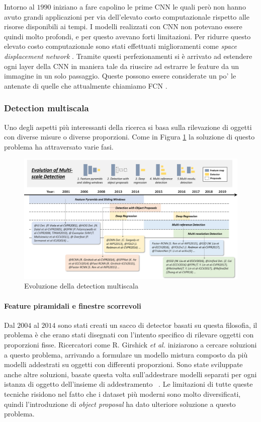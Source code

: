 Intorno al $1990$ iniziano a fare capolino le prime \ac{CNN} \cite{vaillant1994original} le quali però non hanno avuto grandi applicazioni per via dell'elevato costo computazionale rispetto alle risorse disponibili ai tempi. I modelli realizzati con \ac{CNN} non potevano essere quindi molto profondi, e per questo avevano forti limitazioni. Per ridurre questo elevato costo computazionale sono stati effettuati miglioramenti come \textit{space displacement network} \cite{lecun1998gradient}. Tramite questi perfezionamenti si è arrivato ad estendere ogni layer della \ac{CNN} in maniera tale da riuscire ad estrarre le feature da un immagine in un solo passaggio. Queste possono essere considerate un po' le antenate di quelle che attualmente chiamiamo \ac{FCN} \cite{long2015fully} \cite{chen2014semantic}. 
\subsubsection{Detection multiscala}
Uno degli aspetti più interessanti della ricerca si basa sulla rilevazione di oggetti con diverse misure o diverse proporzioni. Come in Figura \ref{fig:multi_scale_history} la soluzione di questo problema ha attraversato varie fasi.
\begin{figure}
    \centering
    \includegraphics[width=\textwidth]{images/evol-multiscale.png}
    \caption{Evoluzione della detection multiscala \cite{DBLP:journals/corr/abs-1905-05055}}
    \label{fig:multi_scale_history}
\end{figure}
\paragraph{Feature piramidali e finestre scorrevoli}
Dal $2004$ al $2014$ sono stati creati un sacco di detector basati su questa filosofia, il problema è che erano stati disegnati con l'intento specifico di rilevare oggetti con proporzioni fisse. Ricercatori come R. Girshick \textit{et al.} iniziarono a cercare soluzioni a questo problema, arrivando a formulare un modello mistura \cite{felzenszwalb2009object} composto da più modelli addestrati su oggetti con differenti proporzioni. Sono state sviluppate anche altre soluzioni, basate questa volta sull'addestrare modelli separati per ogni istanza di oggetto dell'insieme di addestramento \cite{malisiewicz2011ensemble} \cite{malisiewicz2011exemplar}. Le limitazioni di tutte queste tecniche risidono nel fatto che i dataset più moderni sono molto diversificati, quindi l'introduzione di \textit{object proposal} ha dato ulteriore soluzione a questo problema.

